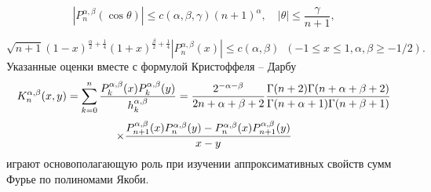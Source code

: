 \begin{equation}\label{7.6}
|P_n^{\alpha,\beta}(\cos\theta)|\le c(\alpha,\beta,\gamma)(n+1)^\alpha, \quad |\theta|\le \frac{\gamma}{n+1},
\end{equation}

\begin{equation}\label{7.7}
\sqrt{n+1}(1-x)^{\frac\alpha2+\frac14}(1+x)^{\frac\beta2+\frac14}
|P_n^{\alpha,\beta}(x)|\le c(\alpha,\beta)\,\,\, (-1\le x\le1,\alpha,\beta\ge-1/2).
\end{equation}
 Указанные оценки вместе с  формулой Кристоффеля -- Дарбу
$$
 K_n^{\alpha,\beta}(x,y)=
\sum_{k=0}^n{P_k^{\alpha,\beta}(x)P_k^{\alpha,\beta}(y)\over
h_k^{\alpha,\beta}}={2^{-\alpha-\beta}\over
2n+\alpha+\beta+2} {\Gamma(n+2)\Gamma(n+\alpha+\beta+2)\over
\Gamma(n+\alpha+1)\Gamma(n+\beta+1)}
 $$
\begin{equation}\label{7.8}
\times  {P_{n+1}^{\alpha,\beta}(x)P_n^{\alpha,\beta}(y)-
P_n^{\alpha,\beta}(x)P_{n+1}^{\alpha,\beta}(y)\over x-y}
\end{equation}
играют основополагающую роль при изучении аппроксимативных свойств  сумм Фурье по полиномами Якоби.


%



